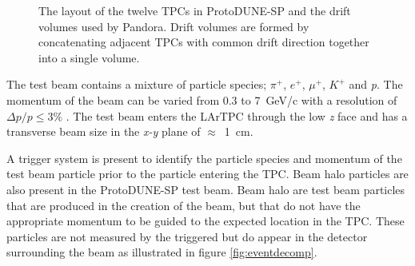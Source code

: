 \begin{figure}
\centering
{}
\caption{The layout of \protect{} the twelve TPCs in ProtoDUNE-SP and \protect{} the drift volumes used by Pandora.  Drift volumes are formed by concatenating adjacent TPCs with common drift direction together into a single volume.}
\label{fig:tpcs}
\end{figure}

The test beam contains a mixture of particle species; $\pi^{+}$, $e^{+}$, $\mu^{+}$, $K^{+}$ and \textit{p}.  The momentum of the beam can be varied from 0.3 to 7~GeV/c with a resolution of $\Delta p/p \leq 3\%$ \cite{pdtdr}.  The test beam enters the LArTPC through the low \textit{z} face and has a transverse beam size in the \textit{x-y} plane of $\approx$~1~cm.

A trigger system is present to identify the particle species and momentum of the test beam particle prior to the particle entering the TPC.  Beam halo particles are also present in the ProtoDUNE-SP test beam.  Beam halo are test beam particles that are produced in the creation of the beam, but that do not have the appropriate momentum to be guided to the expected location in the TPC.  These particles are not measured by the triggered but do appear in the detector surrounding the beam as illustrated in figure \ref{fig:eventdecomp}.

